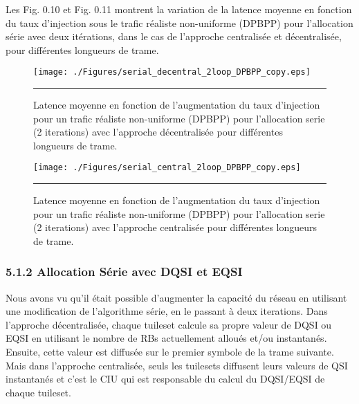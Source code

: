 Les Fig. 0.10 et Fig. 0.11 montrent la variation de la latence moyenne en fonction du taux d'injection sous le trafic réaliste non-uniforme (DPBPP) pour l'allocation série avec deux itérations, dans le cas de l'approche centralisée et décentralisée, pour différentes longueurs de trame. 

\begin{figure}[htbp]
  \centering
    \texttt{[image: ./Figures/serial\_decentral\_2loop\_DPBPP\_copy.eps]}
    \rule{35em}{0.5pt}
  \caption[Latence moyenne en fonction de l'augmentation du taux d'injection pour un trafic réaliste non-uniforme (DPBPP) pour l'allocation serie (2 iterations) avec l'approche décentralisée pour différentes longueurs de trame.]{Latence moyenne en fonction de l'augmentation du taux d'injection pour un trafic réaliste non-uniforme (DPBPP) pour l'allocation serie (2 iterations) avec l'approche décentralisée pour différentes longueurs de trame.}
  \label{fig:Electron}
\end{figure}

\begin{figure}[htbp]
  \centering
    \texttt{[image: ./Figures/serial\_central\_2loop\_DPBPP\_copy.eps]}
    \rule{35em}{0.5pt}
  \caption[Latence moyenne avec l'augmentation du taux d'injection pour un trafic réaliste non-uniforme (DPBPP) pour l'allocation serie (2 iterations) avec l'approche centralisée pour différentes longueurs de trame.]{Latence moyenne en fonction de l'augmentation du taux d'injection pour un trafic réaliste non-uniforme (DPBPP) pour l'allocation serie (2 iterations) avec l'approche centralisée pour différentes longueurs de trame.}
  \label{fig:Electron}
\end{figure}

\subsubsection*{5.1.2 Allocation Série avec DQSI et EQSI}

Nous avons vu qu’il était possible d'augmenter la capacité du réseau en utilisant une modification de l’algorithme série, en le passant à deux iterations. Dans l'approche décentralisée, chaque tuileset calcule sa propre valeur de DQSI ou EQSI en utilisant le nombre de RBs actuellement alloués et/ou instantanés. Ensuite, cette valeur est diffusée sur le premier symbole de la trame suivante. Mais dans l'approche centralisée, seuls les tuilesets diffusent leurs valeurs de QSI instantanés et c’est le CIU qui est responsable du calcul du DQSI/EQSI de chaque tuileset. 


